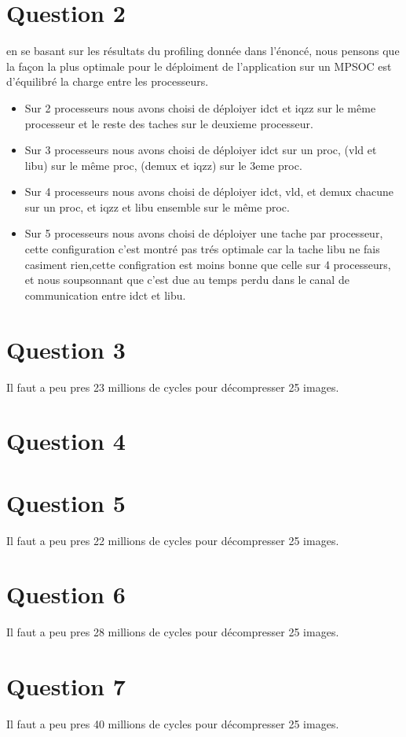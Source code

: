 \documentclass[12pt]{article}
\begin{document}
\section*{Question 2}
en se basant sur les résultats du profiling donnée dans l'énoncé, nous pensons que la façon la plus optimale pour le déploiment de l'application sur un MPSOC est d'équilibré la charge entre les processeurs.\\ 
\begin{itemize}
\item Sur 2 processeurs nous avons choisi de déploiyer idct et iqzz sur le même processeur et le reste des taches sur le deuxieme processeur.\\
\item Sur 3 processeurs nous avons choisi de déploiyer idct sur un proc, (vld et libu) sur le même proc, (demux et iqzz) sur le 3eme proc.\\
\item Sur 4 processeurs nous avons choisi de déploiyer idct, vld, et demux chacune sur un proc, et iqzz et libu ensemble sur le même proc.\\
\item Sur 5 processeurs nous avons choisi de déploiyer une tache par processeur, cette configuration c'est montré pas trés optimale car la tache libu ne fais casiment rien,cette configration est moins bonne que celle sur 4 processeurs, et nous soupsonnant que c'est due au temps perdu dans le canal de communication entre idct et libu.
\end{itemize}
\section*{Question 3}
Il faut a peu pres 23 millions de cycles pour décompresser 25 images.
\section*{Question 4}

\section*{Question 5}
Il faut a peu pres 22 millions de cycles pour décompresser 25 images.
\section*{Question 6}
Il faut a peu pres 28 millions de cycles pour décompresser 25 images.
\section*{Question 7}
Il faut a peu pres 40 millions de cycles pour décompresser 25 images.
\end{document}
